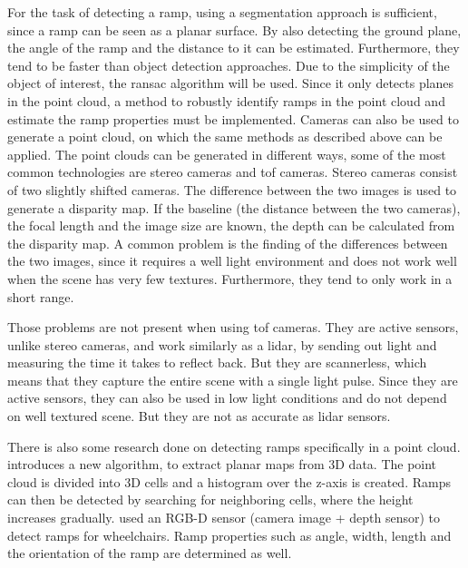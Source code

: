 For the task of detecting a ramp, using a segmentation approach is sufficient, since a ramp can be seen as a planar surface.
By also detecting the ground plane, the angle of the ramp and the distance to it can be estimated.
Furthermore, they tend to be faster than object detection approaches.
Due to the simplicity of the object of interest, the \gls{ransac} algorithm will be used.
Since it only detects planes in the point cloud, a method to robustly identify ramps in the point cloud and estimate the ramp properties must be implemented.
\bigbreak
Cameras can also be used to generate a point cloud, on which the same methods as described above can be applied.
The point clouds can be generated in different ways, some of the most common technologies are stereo cameras and \gls{tof} cameras.
Stereo cameras consist of two slightly shifted cameras.
The difference between the two images is used to generate a disparity map.
If the baseline (the distance between the two cameras), the focal length and the image size are known, the depth can be calculated from the disparity map.
A common problem is the finding of the differences between the two images, since it requires a well light environment and does not work well when the scene has very few textures.
Furthermore, they tend to only work in a short range.

Those problems are not present when using \gls{tof} cameras.
They are active sensors, unlike stereo cameras, and work similarly as a \gls{lidar}, by sending out light and measuring the time it takes to reflect back.
But they are scannerless, which means that they capture the entire scene with a single light pulse.
Since they are active sensors, they can also be used in low light conditions and do not depend on well textured scene.
But they are not as accurate as \gls{lidar} sensors.

There is also some research done on detecting ramps specifically in a point cloud.
\cite{Sakenas2007} introduces a new algorithm, to extract planar maps from 3D data.
The point cloud is divided into 3D cells and a histogram over the z-axis is created.
Ramps can then be detected by searching for neighboring cells, where the height increases gradually.
\cite{Nejati2016} used an RGB-D sensor (camera image + depth sensor) to detect ramps for wheelchairs.
Ramp properties such as angle, width, length and the orientation of the ramp are determined as well.

